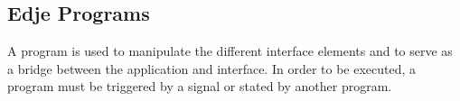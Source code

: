 \documentclass[a4paper]{profusion}
\begin{document}
\begin{description}

\end{description}

\subsection{Edje Programs}

A program is used to manipulate the different interface elements and
to serve as a bridge between the application and interface. In order
to be executed, a program must be triggered by a signal or stated by
another program.
\end{document}
